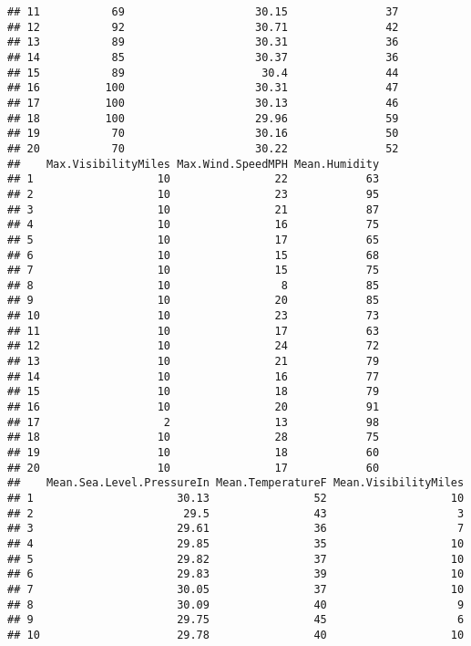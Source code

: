 \documentclass[]{article}
\begin{document}
\begin{verbatim}
## 11           69                    30.15               37
## 12           92                    30.71               42
## 13           89                    30.31               36
## 14           85                    30.37               36
## 15           89                     30.4               44
## 16          100                    30.31               47
## 17          100                    30.13               46
## 18          100                    29.96               59
## 19           70                    30.16               50
## 20           70                    30.22               52
##    Max.VisibilityMiles Max.Wind.SpeedMPH Mean.Humidity
## 1                   10                22            63
## 2                   10                23            95
## 3                   10                21            87
## 4                   10                16            75
## 5                   10                17            65
## 6                   10                15            68
## 7                   10                15            75
## 8                   10                 8            85
## 9                   10                20            85
## 10                  10                23            73
## 11                  10                17            63
## 12                  10                24            72
## 13                  10                21            79
## 14                  10                16            77
## 15                  10                18            79
## 16                  10                20            91
## 17                   2                13            98
## 18                  10                28            75
## 19                  10                18            60
## 20                  10                17            60
##    Mean.Sea.Level.PressureIn Mean.TemperatureF Mean.VisibilityMiles
## 1                      30.13                52                   10
## 2                       29.5                43                    3
## 3                      29.61                36                    7
## 4                      29.85                35                   10
## 5                      29.82                37                   10
## 6                      29.83                39                   10
## 7                      30.05                37                   10
## 8                      30.09                40                    9
## 9                      29.75                45                    6
## 10                     29.78                40                   10

\end{verbatim}
\end{document}
